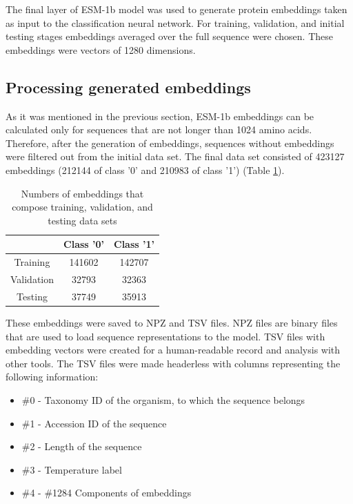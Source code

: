 \documentclass[12pt]{article}
\begin{document}
	The final layer of ESM-1b model was used to generate protein embeddings
	taken as input to the classification neural network. For training, validation,
	and initial testing stages embeddings averaged over the full sequence were
	chosen. These embeddings were vectors of 1280 dimensions.

	\subsection{Processing generated embeddings}

	As it was mentioned in the previous section, ESM-1b embeddings can be 
	calculated only for sequences that are not longer than 1024 amino acids.
	Therefore, after the generation of embeddings, sequences without embeddings 
	were filtered out from the initial data set. The final data set consisted
	of 423127 embeddings (212144 of class '0' and 210983 of class '1') (Table 
	\ref{table:embeddings003}).

	\begin{table}[h!]
		\caption{Numbers of embeddings that compose training, 
		validation, and testing data sets}
		\vspace{0.2cm}
		\centering
		\begin{tabular}{ | c c c | }
			\hline 
			& Class '0' & Class '1' \\
			\hline 
			Training & 141602 & 142707 \\
			Validation & 32793 & 32363 \\
			Testing & 37749 & 35913 \\
			\hline    
		\end{tabular}
		\label{table:embeddings003}
	\end{table}

	These embeddings were saved to NPZ and TSV files. NPZ files are binary 
	files that are used to load sequence representations to the model. TSV 
	files with embedding vectors were created for a human-readable record 
	and analysis with other tools. The TSV files were made headerless with 
	columns representing the following information:

	\begin{itemize}
		\item \#0 - Taxonomy ID of the organism, to which the sequence belongs
		\item \#1 - Accession ID of the sequence
		\item \#2 - Length of the sequence
		\item \#3 - Temperature label
		\item \#4 - \#1284 Components of embeddings
	  \end{itemize}
\end{document}
